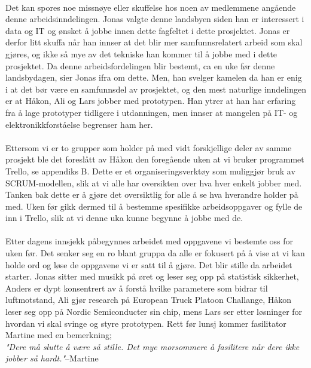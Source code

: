 \\Det kan spores noe missnøye eller skuffelse hos noen av medlemmene angående denne arbeidsinndelingen. Jonas valgte denne landsbyen siden han er interessert i data og IT og ønsket å jobbe innen dette fagfeltet i dette prosjektet. Jonas er derfor litt skuffa når han innser at det blir mer samfunnsrelatert arbeid som skal gjøres, og ikke så mye av det tekniske han kommer til å jobbe med i dette prosjektet. Da denne arbeidsfordelingen blir bestemt, ca en uke før denne landsbydagen, sier Jonas ifra om dette. Men, han svelger kamelen da han er enig i at det bør være en samfunnsdel av prosjektet, og den mest naturlige inndelingen er at Håkon, Ali og Lars jobber med prototypen. Han ytrer at han har erfaring fra å lage prototyper tidligere i utdanningen, men innser at mangelen på IT- og elektronikkforståelse begrenser ham her.\\
\\
Ettersom vi er to grupper som holder på med vidt forskjellige deler av samme prosjekt ble det foreslått av Håkon den foregående uken at vi bruker programmet Trello, se appendiks B. Dette er et organiseringsverktøy som muliggjør bruk av SCRUM-modellen, slik at vi alle har oversikten over hva hver enkelt jobber med. Tanken bak dette er å gjøre det oversiktlig for alle å se hva hverandre holder på med. Uken før  gikk dermed til å bestemme spesifikke arbeidsoppgaver og fylle de inn i Trello, slik at vi denne uka kunne begynne å jobbe med de.\\

\\Etter dagens innsjekk påbegynnes arbeidet med oppgavene vi bestemte oss for uken før. Det senker seg en ro blant gruppa da alle er fokusert på å vise at vi kan holde ord og løse de oppgavene vi er satt til å gjøre. Det blir stille da arbeidet starter. Jonas sitter med musikk på øret og leser seg opp på statistisk sikkerhet, Anders er dypt konsentrert av å forstå hvilke parametere som bidrar til luftmotstand, Ali gjør research på European Truck Platoon Challange, Håkon leser seg opp på Nordic Semiconducter sin chip, mens Lars ser etter løsninger for hvordan vi skal svinge og styre prototypen. 
Rett før lunsj kommer fasilitator Martine med en bemerkning; \\

\textit{"Dere må slutte å være så stille. Det mye morsommere å fasilitere når dere ikke jobber så hardt."}{--Martine}\\ 

